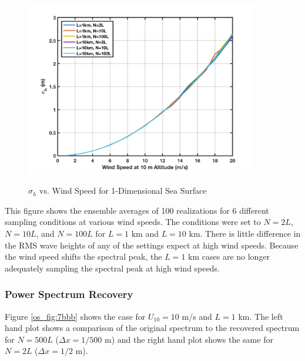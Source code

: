 \begin{figure}[ht]
  \begin{center}
\includegraphics[width=4in]{../media/Ocean_Surface/1d_ensemble_rms.png}
  \end{center}
  \renewcommand{\baselinestretch}{1} \small\normalsize
  \begin{quote}
    \caption[$\sigma_h$ vs. Wind Speed for 1-Dimensional Sea Surface]{$\sigma_h$ vs. Wind Speed for 1-Dimensional Sea Surface\label{os_fig:7fff}}
  \end{quote}
\end{figure}
\renewcommand{\baselinestretch}{2} \small\normalsize

This figure shows the ensemble averages of 100 realizations for 6 different sampling conditions at various wind speeds. The conditions were set to $N = 2L$, $N = 10L$, and $N = 100L$ for $L = 1$ km and $L = 10$ km. There is little difference in the RMS wave heights of any of the settings expect at high wind speeds. Because the wind speed shifts the spectral peak, the $L = 1$ km cases are no longer adequately sampling the spectral peak at high wind speeds.

\subsubsection {Power Spectrum Recovery}
Figure \ref{os_fig:7bbb} shows the case for $U_{10} = 10$ m/s and $L = 1$ km. The left hand plot shows a comparison of the original spectrum to the recovered spectrum for $N = 500L$ ($\Delta x = 1/500$ m) and the right hand plot shows the same for $N=2L$ ($\Delta x = 1/2$ m).

